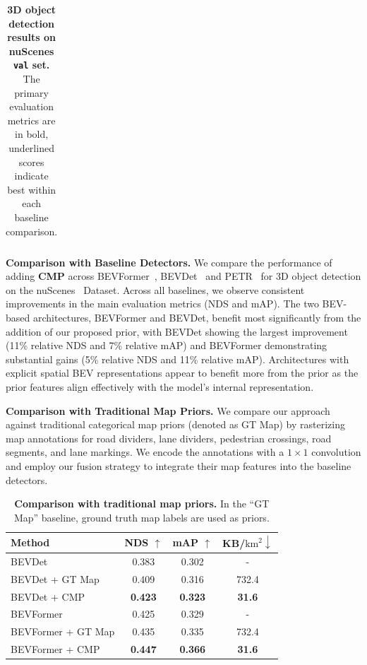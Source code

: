 \documentclass{article} %
\newcommand{\myparagraph}[1]{\vspace{0.2em}\noindent\textbf{#1}}
\newcommand{\tablestyle}[2]{\setlength{\tabcolsep}{#1}\renewcommand{\arraystretch}{#2}\centering\small}
\newcommand{\ours}{CMP\xspace}
\newcommand{\oursbold}{\textbf{\ours}\xspace}
\begin{document}
\begin{table}[t]
{\begin{tabular}{lrr|rrrrr}
			\bottomrule
		\end{tabular}
	}
	\caption{
		\textbf{3D object detection results on nuScenes \texttt{val} set.}
        The primary evaluation metrics are in bold, underlined scores indicate best within each baseline comparison.
	}
	\label{tab:main}
\end{table}
\myparagraph{Comparison with Baseline Detectors.}
We compare the performance of adding \oursbold across BEVFormer~\cite{li2022bevformer}, BEVDet~\cite{huang2021bevdet} and PETR~\cite{liu2022petr} for 3D object detection on the nuScenes~\cite{caesar2020nuscenes} Dataset.
Across all baselines, we observe consistent improvements in the main evaluation metrics (NDS and mAP).
The two BEV-based architectures, BEVFormer and BEVDet, benefit most significantly from the addition of our proposed prior, with BEVDet showing the largest improvement (11\% relative NDS and 7\% relative mAP) and BEVFormer demonstrating substantial gains (5\% relative NDS and 11\% relative mAP).
Architectures with explicit spatial BEV representations appear to benefit more from the prior as the prior features align effectively with the model's internal representation.

\myparagraph{Comparison with Traditional Map Priors.}
We compare our approach against traditional categorical map priors (denoted as GT Map) by rasterizing map annotations for road dividers, lane dividers, pedestrian crossings, road segments, and lane markings.
We encode the annotations with a $1 \times 1$ convolution and employ our fusion strategy to integrate their map features into the baseline detectors.

\begin{table}[t]
	\centering
	\tablestyle{6pt}{1.05}
	\begin{tabular}{lccc}
		\toprule
		Method             & NDS $\uparrow$ & mAP $\uparrow$ & KB/$\text{km}^2 \downarrow$ \\
		\midrule
		BEVDet             & 0.383          & 0.302      & -    \\
		BEVDet + GT Map    & 0.409          & 0.316          & 732.4 \\
		BEVDet + \ours     & \textbf{0.423} & \textbf{0.323} & \textbf{31.6} \\
		\midrule
		BEVFormer          & 0.425          & 0.329         & - \\
		BEVFormer + GT Map & 0.435          & 0.335         & 732.4 \\
		BEVFormer + \ours  & \textbf{0.447} & \textbf{0.366} &\textbf{31.6} \\
		\bottomrule
	\end{tabular}
	\caption{\textbf{Comparison with traditional map priors.}
	In the ``GT Map'' baseline, ground truth map labels are used as priors.
	}
	\label{tab:map_prior}
\end{table}
\end{document}
